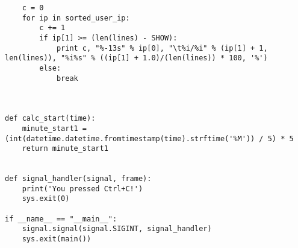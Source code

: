 \begin{lstlisting}
    c = 0
    for ip in sorted_user_ip:
        c += 1
        if ip[1] >= (len(lines) - SHOW):
            print c, "%-13s" % ip[0], "\t%i/%i" % (ip[1] + 1, len(lines)), "%i%s" % ((ip[1] + 1.0)/(len(lines)) * 100, '%')
        else:
            break



def calc_start(time):
    minute_start1 = (int(datetime.datetime.fromtimestamp(time).strftime('%M')) / 5) * 5
    return minute_start1


def signal_handler(signal, frame):
    print('You pressed Ctrl+C!')
    sys.exit(0)

if __name__ == "__main__":
    signal.signal(signal.SIGINT, signal_handler)
    sys.exit(main())

\end{lstlisting}


